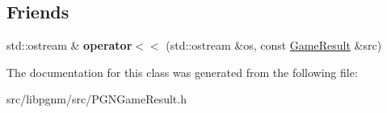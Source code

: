 \subsection*{Friends}
\begin{DoxyCompactItemize}
\item 
\hypertarget{classpgn_1_1GameResult_a27d55f60e270a7372206724456570c00}{
std::ostream \& {\bfseries operator$<$$<$} (std::ostream \&os, const \hyperlink{classpgn_1_1GameResult}{GameResult} \&src)}
\label{classpgn_1_1GameResult_a27d55f60e270a7372206724456570c00}

\end{DoxyCompactItemize}


The documentation for this class was generated from the following file:\begin{DoxyCompactItemize}
\item 
src/libpgnm/src/PGNGameResult.h\end{DoxyCompactItemize}
